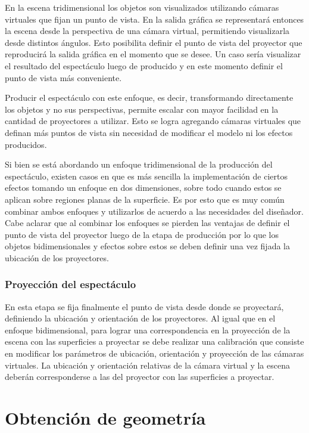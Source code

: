 En la escena tridimensional los objetos son visualizados utilizando cámaras virtuales que fijan un punto de vista. En la salida gráfica se representará entonces la escena desde la perspectiva de una cámara virtual, permitiendo visualizarla desde distintos ángulos. Esto posibilita definir el punto de vista del proyector que reproducirá la salida gráfica en el momento que se desee. Un caso sería visualizar el resultado del espectáculo luego de producido y en este momento definir el punto de vista más conveniente.

Producir el espectáculo con este enfoque, es decir, transformando directamente los objetos y no sus perspectivas, permite escalar con mayor facilidad en la cantidad de proyectores a utilizar. Esto se logra agregando cámaras virtuales que definan más puntos de vista sin necesidad de modificar el modelo ni los efectos producidos.

Si bien se está abordando un enfoque tridimensional de la producción del espectáculo, existen casos en que es más sencilla la implementación de ciertos efectos tomando un enfoque en dos dimensiones, sobre todo cuando estos se aplican sobre regiones planas de la superficie. Es por esto que es muy común combinar ambos enfoques y utilizarlos de acuerdo a las necesidades del diseñador. Cabe aclarar que al combinar los enfoques se pierden las ventajas de definir el punto de vista del proyector luego de la etapa de producción por lo que los objetos bidimensionales y efectos sobre estos se deben definir una vez fijada la ubicación de los proyectores.

\subsubsection{Proyección del espectáculo}

En esta etapa se fija finalmente el punto de vista desde donde se proyectará, definiendo la ubicación y orientación de los proyectores.
Al igual que en el enfoque bidimensional, para lograr una correspondencia en la proyección de la escena con las superficies a proyectar se debe realizar una calibración que consiste en modificar los parámetros de ubicación, orientación y proyección de las cámaras virtuales.
La ubicación y orientación relativas de la cámara virtual y la escena deberán corresponderse a las del proyector con las superficies a proyectar.


\section{Obtención de geometría}

